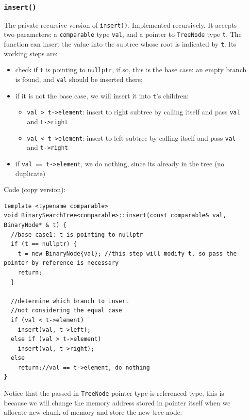 \documentclass[11pt]{book}
\begin{document}
\subsubsection{\texttt{insert()}}
\label{sec:orge7221e2}
The private recursive version of \texttt{insert()}. Implemented recursively. It accepts two parameters: a \texttt{comparable} type \texttt{val}, and a pointer to \texttt{TreeNode} type \texttt{t}. The function can insert the value into the subtree whose root is indicated by \texttt{t}. Its working steps are:
\begin{itemize}
\item check if \texttt{t} is pointing to \texttt{nullptr}, if so, this is the base case: an empty branch is found, and \texttt{val} should be inserted there;
\item if it is not the base case, we will insert it into \texttt{t}'s children:
\begin{itemize}
\item \texttt{val > t->element}: insert to right subtree by calling itself and pass \texttt{val} and \texttt{t->right}
\item \texttt{val < t->element}: insert to left subtree by calling itself and pass \texttt{val} and \texttt{t->right}
\end{itemize}
\item if \texttt{val == t->element}, we do nothing, since its already in the tree (no duplicate)
\end{itemize}

Code (copy version):
\begin{verbatim}
template <typename comparable>
void BinarySearchTree<comparable>::insert(const comparable& val, BinaryNode* & t) {  
  //base case1: t is pointing to nullptr
  if (t == nullptr) {
    t = new BinaryNode{val}; //this step will modify t, so pass the pointer by reference is necessary
    return;
  }

  //determine which branch to insert 
  //not considering the equal case 
  if (val < t->element)
    insert(val, t->left);
  else if (val > t->element)
    insert(val, t->right);
  else
    return;//val == t->element, do nothing
}
\end{verbatim}

Notice that the passed in \texttt{TreeNode} pointer type is referenced type, this is because we will change the memory address stored in pointer itself when we allocate new chunk of memory and store the new tree node.
\end{document}
